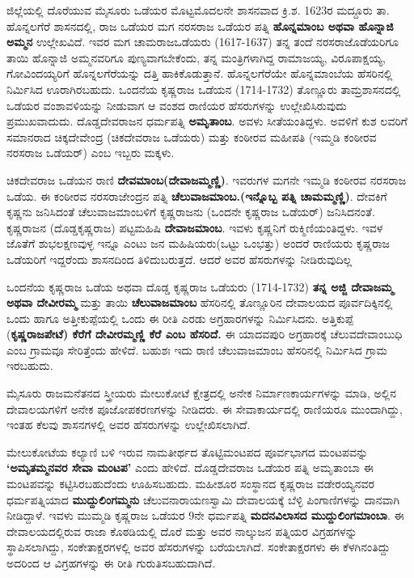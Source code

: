 ಜಿಲ್ಲೆಯಲ್ಲಿ ದೊರೆಯುವ ಮೈಸೂರು ಒಡೆಯರ ಮೊಟ್ಟಮೊದಲನೇ ಶಾಸನವಾದ ಕ್ರಿ.ಶ. 1623ರ ಮದ್ದೂರು ತಾ. ಹೊನ್ನಲಗೆರೆ ಶಾಸನದಲ್ಲಿ, ರಾಜ ಒಡೆಯರ ಮಗ ನರಸರಾಜ ಒಡೆಯರ ಪತ್ನಿ \textbf{ಹೊನ್ನಮಾಂಬ ಅಥವಾ ಹೊನ್ನಾಜಿ ಅಮ್ಮನ} ಉಲ್ಲೇಖವಿದೆ. ಇವರ ಮಗ ಚಾಮರಾಜಒಡೆಯರು (1617-1637) ತನ್ನ ತಂದೆ ನರಸರಾಜೊಡೆಯರಿಗೂ ತಾಯಿ ಹೊನ್ನಾಜಿ ಅಮ್ಮನವರಿಗೂ ಪುಣ್ಯವಾಗಬೇಕೆಂದು, ತನ್ನ ಮಂತ್ರಿಗಳಾಗಿದ್ದ ರಾಮಾಜಯ್ಯ, ವಿರೂಪಾಕ್ಷಯ್ಯ, ಗೋವಿಂದಯ್ಯರಿಗೆ ಹೊನ್ನಲಗೆರೆಯನ್ನು ದತ್ತಿ ಹಾಕಿಕೊಡುತ್ತಾನೆ. ಹೊನ್ನಲಗೆರೆಯೇ ಹೊನ್ನಮಾಂಬೆಯ ಹೆಸರಿನಲ್ಲಿ ನಿರ್ಮಿಸಿದ ಊರಾಗಿರಬಹುದು. ಒಂದನೆಯ ಕೃಷ್ಣರಾಜ ಒಡೆಯನ (1714-1732) ತೊಣ್ಣೂರು ತಾಮ್ರಶಾಸನದಲ್ಲಿ ಒಡೆಯರ ವಂಶಾವಳಿಯನ್ನು ನೀಡುವಾಗ ಆ ವಂಶದ ರಾಣಿಯರ ಹೆಸರುಗಳನ್ನು ಉಲ್ಲೇಖಿಸಿರುವುದು ಪ್ರಮುಖವಾದುದು. ದೊಡ್ಡದೇವರಾಜನ ಧರ್ಮಪತ್ನಿ \textbf{ಅಮೃತಾಂಬ}. ಅವಳು ಸೀತೆಯಂತಿದ್ದಳು. ಅವಳಿಗೆ ಕುಶ ಲವರಿಗೆ ಸಮಾನರಾದ ಚಿಕ್ಕದೇವೇಂದ್ರ (ಚಿಕದೇವರಾಜ ಒಡೆಯರು) ಮತ್ತು ಕಂಠೀರವ ಮಹೀಪತಿ (ಇಮ್ಮಡಿ ಕಂಠೀರವ ನರಸರಾಜ ಒಡೆಯರ್​) ಎಂಬ ಇಬ್ಬರು ಮಕ್ಕಳು.

ಚಿಕದೇವರಾಜ ಒಡೆಯನ ರಾಣಿ \textbf{ದೇವಮಾಂಬ(ದೇವಾಜಮ್ಮಣ್ಣಿ)}. ಇವರುಗಳ ಮಗನೇ ಇಮ್ಮಡಿ ಕಂಠೀರವ ನರಸರಾಜ ಒಡೆಯ. ಈ ಕಂಠೀರವ ನರಸರಾಜೇಂದ್ರನ ಪತ್ನಿ \textbf{ಚೆಲುವಾಜಮಾಂಬ.(ಇನ್ನೊಬ್ಬ ಪತ್ನಿ ಚಾಮಮ್ಮಣ್ಣಿ)}. ದೇವಕಿಗೆ ಕೃಷ್ಣನು ಜನಿಸಿದಂತೆ ಚೆಲುವಾಜಮಾಂಬಳಿಗೆ ಕೃಷ್ಣರಾಜನು (ಒಂದನೇ ಕೃಷ್ಣರಾಜ ಒಡೆಯರ್​) ಜನಿಸಿದನಂತೆ. ಕೃಷ್ಣರಾಜನ (ದೊಡ್ಡಕೃಷ್ಣರಾಜ) ಪಟ್ಟಮಹಿಷಿ \textbf{ದೇವಾಜಮಾಂಬ}. ಇವಳು ಕೃಷ್ಣನಿಗೆ ರುಕ್ಮಿಣಿಯಂತಿದ್ದಳು. ಇವಳ ಜೊತೆಗೆ ಶುಭಲಕ್ಷಣವುಳ್ಳ ಇನ್ನೂ ಎಂಟು ಜನ ಮಹಿಷಿಯರು(ಒಟ್ಟು ಒಂಭತ್ತು) ಅಂದರೆ ರಾಣಿಯರು ಕೃಷ್ಣರಾಜ ಒಡೆಯರಿಗೆ ಇದ್ದರೆಂದು ಶಾಸನದಿಂದ ತಿಳಿದುಬರುತ್ತದೆ. ಆದರೆ ಅವರ ಹೆಸರುಗಳನ್ನು ನೀಡಿರುವುದಿಲ್ಲ

ಒಂದನೆಯ ಕೃಷ್ಣರಾಜ ಒಡೆಯ ಅಥವಾ ದೊಡ್ಡ ಕೃಷ್ಣರಾಜ ಒಡೆಯರು (1714-1732) \textbf{ತನ್ನ ಅಜ್ಜಿ ದೇವಾಜಮ್ಮ ಅಥವಾ ದೇವೀರಮ್ಮ} ಮತ್ತು ತಾಯಿ \textbf{ಚೆಲುವಾಜಮಾಂಬ} ಹೆಸರಿನಲ್ಲಿ ತೊಣ್ಣೂರಿನ ದೇವಾಲಯದ ಪೂರ್ವದಿಕ್ಕಿನಲ್ಲಿ ಒಂದು ಹಾಗೂ ಅತ್ತೀಕುಪ್ಪೆಯಲ್ಲಿ ಒಂದು ಈ ರೀತಿ ಎರಡು ಅಗ್ರಹಾರಗಳನ್ನು ನಿರ್ಮಿಸಿದನು. ಅತ್ತಿಕುಪ್ಪೆ (\textbf{ಕೃಷ್ಣರಾಜಪೇಟೆ) ಕೆರೆಗೆ ದೇವೀರಮ್ಮಣ್ಣಿ ಕೆರೆ ಎಂಬ ಹೆಸರಿದೆ.} ಈ ಯಾದವಪುರಿ ಅಗ್ರಹಾರಕ್ಕೆ ಚೆಲುವದೇವಾಂಬುಧಿ ಎಂಬ ಗ್ರಾಮವೂ ಸೇರಿತ್ತೆಂದು ಹೇಳಿದೆ. ಬಹುಶಃ ಇದು ರಾಣಿ ಚೆಲುವಾಜಮಾಂಬ ಹೆಸರಿನಲ್ಲಿ ನಿರ್ಮಿಸಿದ ಗ್ರಾಮ ಇರಬಹುದು.

ಮೈಸೂರು ರಾಜಮನೆತನದ ಸ್ತ್ರೀಯರು ಮೇಲುಕೋಟೆ ಕ್ಷೇತ್ರದಲ್ಲಿ ಅನೇಕ ನಿರ್ಮಾಣಕಾರ್ಯಗಳನ್ನು ಮಾಡಿ, ಅಲ್ಲಿನ ದೇವಾಲಯಗಳಿಗೆ ಅನೇಕ ಪೂಜೋಪಕರಣಗಳನ್ನು ನೀಡಿದರು. ಈ ಸೇವಾಕಾರ್ಯದಲ್ಲಿ ರಾಣಿಯರೂ ಮುಂದಾಗಿದ್ದು, ಇಂತಹ ಕೆಲವು ಶಾಸನಗಳಲ್ಲಿ ಅವರ ಹೆಸರುಗಳನ್ನು ಉಲ್ಲೇಖಿಸಲಾಗಿದೆ.

ಮೇಲುಕೋಟೆಯ ಕಲ್ಯಾಣಿ ಬಳಿ ಇರುವ ನಾಮತೀರ್ಥದ ತೊಟ್ಟಿಮಂಟಪದ ಪೂರ್ವಭಾಗದ ಮಂಟಪವನ್ನು \textbf{‘ಅಮೃತಮ್ಮನವರ ಸೇವಾ ಮಂಟಪ’} ಎಂದು ಹೇಳಿದೆ. ದೊಡ್ಡದೇವರಾಜ ಒಡೆಯರ ಪತ್ನಿ ಅಮೃತಾಂಬಾ ಈ ಮಂಟಪವನ್ನು ಕಟ್ಟಿಸಿರಬಹುದೆಂದು ಊಹಿಸಬಹುದು. ಮಹೀಶೂರ ಸಂಸ್ಥಾನದ ಕೃಷ್ಣರಾಜ ವಡೇರಯ್ಯನವರ ಧರ್ಮಪತ್ನಿಯಾದ \textbf{ಮುದ್ದುಲಿಂಗಮ್ಮನು} ಚೆಲುವನಾರಾಯಣಸ್ವಾಮಿ ದೇವಾಲಯಕ್ಕೆ ಬೆಳ್ಳಿ ಪಿಂಗಾಣಿಗಳನ್ನು ದಾನವಾಗಿ ನೀಡಿದ್ದಾಳೆ. ಇವಳು ಮುಮ್ಮಡಿ ಕೃಷ್ಣರಾಜ ಒಡೆಯರ 9ನೇ ಧರ್ಮಪತ್ನಿ \textbf{ಮದನವಿಲಾಸದ ಮುದ್ದುಲಿಂಗಮಾಂಬಾ}. ಈ ದೇವಾಲಯದಲ್ಲಿರುವ ರಾಜಾ ಕೊಠಡಿಯಲ್ಲಿ ದೊರೆ ಮತ್ತು ಅವರ ನಾಲ್ಕುಜನ ಪತ್ನಿಯರ ವಿಗ್ರಹಗಳನ್ನು ಸ್ಥಾಪಿಸಲಾಗಿದ್ದು, ಸಂಕೇತಾಕ್ಷರಗಳಲ್ಲಿ ಅವರ ಹೆಸರುಗಳನ್ನು ಬರೆಯಲಾಗಿದೆ. ಸಂಕೇತಾಕ್ಷರಗಳು ಈ ಕೆಳಗಿನಂತಿದ್ದು ಅದರಿಂದ ಆ ವಿಗ್ರಹಗಳನ್ನು ಈ ರೀತಿ ಗುರುತಿಸಬಹುದಾಗಿದೆ.

